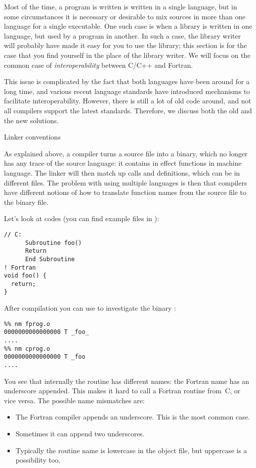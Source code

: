 
Most of the time, a program is written is written in a single
language, but in some circumstances it is necessary or desirable to
mix sources in more than one language for a single executable. One
such case is when a library is written in one language, but used by a
program in another. In such a case, the library writer will probably
have made it easy for you to use the library; this section is for the
case that you find yourself in the place of the library writer. We
will focus on the common case of \emph{interoperability} between C/C++ and
Fortran.

This issue is complicated by the fact that both languages have
been around for a long time, and various recent language standards
have introduced mechanisms to facilitate interoperability.
However, there is still a lot of old code around, and not all compilers
support the latest standards. Therefore, we discuss both the old 
and the new solutions.

 {Linker conventions}

As explained above, a compiler turns a source file into a binary,
which no longer has any trace of the source language: it contains in
effect functions in machine language. The linker will then match up
calls and definitions, which can be in different files. The problem
with using multiple languages is then that compilers have different
notions of how to translate function names from the source file to the
binary file.

Let's look at codes (you can find example files in ):
\begin{verbatim}
// C:
      Subroutine foo()
      Return
      End Subroutine
! Fortran
void foo() {
  return;
}
\end{verbatim}
After compilation you can use 
 to investigate the binary :
\begin{verbatim}
%% nm fprog.o
0000000000000000 T _foo_
....
%% nm cprog.o
0000000000000000 T _foo
....
\end{verbatim}
You see that internally the  routine has different names:
the Fortran name has an underscore appended. This makes
it hard to call a Fortran routine from~C, or vice versa.
The possible name mismatches are:
\begin{itemize}
\item The Fortran compiler appends an underscore. This is the most common case.
\item Sometimes it can append two underscores.
\item Typically the routine name is lowercase in the object file, but uppercase
      is a possibility too.
\end{itemize}

